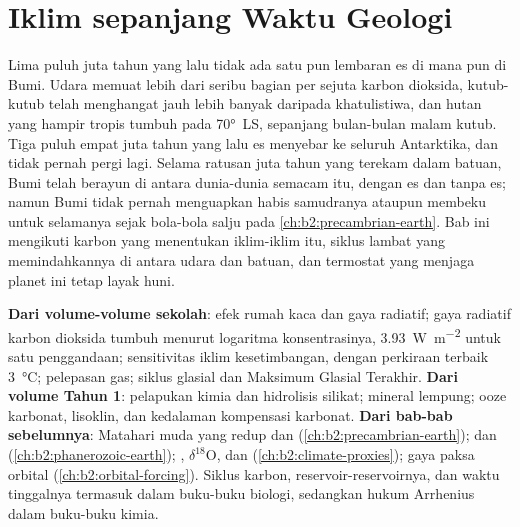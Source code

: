 \chapter{Iklim sepanjang Waktu Geologi}\label{ch:b2:deep-time-climate}

Lima puluh juta tahun yang lalu tidak ada satu pun lembaran es di mana pun di Bumi. Udara memuat lebih dari
seribu bagian per sejuta karbon dioksida, kutub-kutub telah menghangat jauh lebih banyak daripada khatulistiwa, dan
hutan yang hampir tropis tumbuh pada \ang{70}~LS, sepanjang bulan-bulan malam kutub. Tiga puluh empat
juta tahun yang lalu es menyebar ke seluruh Antarktika, dan tidak pernah pergi lagi. Selama ratusan juta
tahun yang terekam dalam batuan, Bumi telah berayun di antara dunia-dunia semacam itu, dengan es dan tanpa es; namun
Bumi tidak pernah menguapkan habis samudranya ataupun membeku untuk selamanya sejak bola-bola salju pada
\cref{ch:b2:precambrian-earth}. Bab ini mengikuti karbon yang menentukan iklim-iklim itu, siklus lambat
yang memindahkannya di antara udara dan batuan, dan termostat yang menjaga planet ini tetap
layak huni.

\begin{recall}
\textbf{Dari volume-volume sekolah}: efek rumah kaca dan gaya radiatif; gaya radiatif
karbon dioksida tumbuh menurut logaritma konsentrasinya, \qty{3.93}{W.m^{-2}} untuk satu penggandaan;
sensitivitas iklim kesetimbangan, dengan perkiraan terbaik \qty{3}{\celsius}; pelepasan gas; siklus glasial
dan Maksimum Glasial Terakhir. \textbf{Dari volume Tahun 1}: pelapukan kimia dan
hidrolisis silikat; mineral lempung; ooze karbonat, lisoklin, dan kedalaman kompensasi
karbonat. \textbf{Dari bab-bab sebelumnya}: Matahari muda yang redup dan 
(\cref{ch:b2:precambrian-earth});  dan 
(\cref{ch:b2:phanerozoic-earth}); , $\delta^{18}$O, dan 
(\cref{ch:b2:climate-proxies}); gaya paksa orbital (\cref{ch:b2:orbital-forcing}). Siklus karbon,
reservoir-reservoirnya, dan waktu tinggalnya termasuk dalam buku-buku biologi, sedangkan hukum Arrhenius dalam
buku-buku kimia.
\end{recall}


